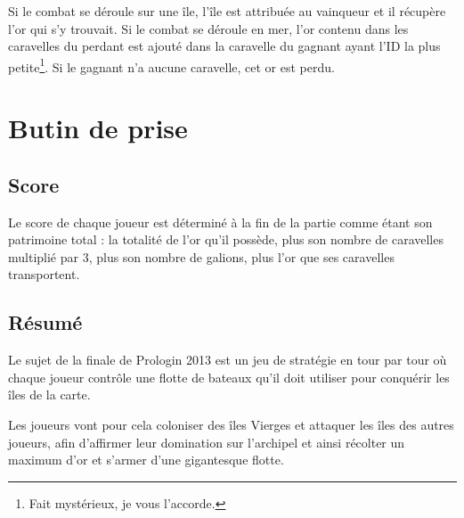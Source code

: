 Si le combat se déroule sur une île, l'île est attribuée au vainqueur et il
récupère l'or qui s'y trouvait. Si le combat se déroule en mer, l'or contenu
dans les caravelles du perdant est ajouté dans la caravelle du gagnant ayant
l'ID la plus petite\footnote{Fait mystérieux, je vous l'accorde.}. Si le gagnant n'a aucune caravelle, cet or est perdu.

\section{Butin de prise}

\subsection{Score}
Le score de chaque joueur est déterminé à la fin de la partie comme étant son patrimoine total : la
totalité de l'or qu'il possède, plus son nombre de caravelles multiplié par 3, plus son nombre de galions, plus l'or que ses caravelles transportent.

\subsection{Résumé}
Le sujet de la finale de Prologin 2013 est un jeu de stratégie en tour par tour
où chaque joueur contrôle une flotte de bateaux qu'il doit utiliser pour
conquérir les îles de la carte.

Les joueurs vont pour cela coloniser des îles Vierges et attaquer les îles des
autres joueurs, afin d'affirmer leur domination sur l'archipel et ainsi récolter
un maximum d'or et s'armer d'une gigantesque flotte.

